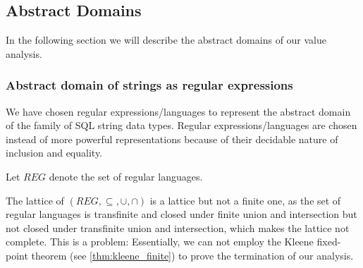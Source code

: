 \subsection{Abstract Domains}\label{subsec:abstract-domains}

In the following section we will describe the abstract domains of our value analysis.

\subsubsection{Abstract domain of strings as regular expressions}\label{subsubsec:abstract_domains_strings}
We have chosen regular expressions/languages to represent the abstract domain of the family of SQL string data types.
Regular expressions/languages are chosen instead of more powerful representations because of their decidable nature of inclusion and equality.

Let $REG$ denote the set of regular languages. %

The lattice of $(REG, \subseteq, \cup, \cap)$ is a lattice but not a finite one, as the set of regular languages is transfinite and closed under finite union and intersection but not closed under transfinite union and intersection, which makes the lattice not complete.
This is a problem: Essentially, we can not employ the Kleene fixed-point theorem (see \autoref{thm:kleene_finite}) to prove the termination of our analysis.

